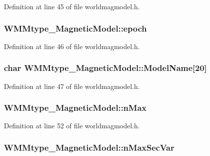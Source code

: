 Definition at line 45 of file worldmagmodel.\-h.

\hypertarget{struct_w_m_mtype___magnetic_model_ad2771cf6f5255fee58bff61029680f82}{
\subsubsection[{epoch}]{ W\-M\-Mtype\-\_\-\-Magnetic\-Model\-::epoch}}\label{struct_w_m_mtype___magnetic_model_ad2771cf6f5255fee58bff61029680f82}


Definition at line 46 of file worldmagmodel.\-h.

\hypertarget{struct_w_m_mtype___magnetic_model_a11d5a44016770e140c397467b40c7755}{
\subsubsection[{Model\-Name}]{\setlength{\rightskip}{0pt plus 5cm}char W\-M\-Mtype\-\_\-\-Magnetic\-Model\-::\-Model\-Name\mbox{[}20\mbox{]}}}\label{struct_w_m_mtype___magnetic_model_a11d5a44016770e140c397467b40c7755}


Definition at line 47 of file worldmagmodel.\-h.

\hypertarget{struct_w_m_mtype___magnetic_model_a3cea165ace9c22b7301ac75ae8cacedb}{
\subsubsection[{n\-Max}]{ W\-M\-Mtype\-\_\-\-Magnetic\-Model\-::n\-Max}}\label{struct_w_m_mtype___magnetic_model_a3cea165ace9c22b7301ac75ae8cacedb}


Definition at line 52 of file worldmagmodel.\-h.

\hypertarget{struct_w_m_mtype___magnetic_model_a8a16d64376b1a82317aaffc2917271bb}{
\subsubsection[{n\-Max\-Sec\-Var}]{ W\-M\-Mtype\-\_\-\-Magnetic\-Model\-::n\-Max\-Sec\-Var}}\label{struct_w_m_mtype___magnetic_model_a8a16d64376b1a82317aaffc2917271bb}


